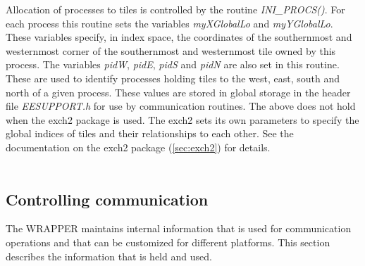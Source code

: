 Allocation of processes to tiles is controlled by the routine {\em
  INI\_PROCS()}. For each process this routine sets the variables {\em
  myXGlobalLo} and {\em myYGlobalLo}.  These variables specify, in
index space, the coordinates of the southernmost and westernmost
corner of the southernmost and westernmost tile owned by this process.
The variables {\em pidW}, {\em pidE}, {\em pidS} and {\em pidN} are
also set in this routine. These are used to identify processes holding
tiles to the west, east, south and north of a given process. These
values are stored in global storage in the header file {\em
  EESUPPORT.h} for use by communication routines.  The above does not
hold when the exch2 package is used.  The exch2 sets its own
parameters to specify the global indices of tiles and their
relationships to each other.  See the documentation on the exch2
package (\ref{sec:exch2}) for details.
\\

 \\


\subsection{Controlling communication}
The WRAPPER maintains internal information that is used for communication
operations and that can be customized for different platforms. This section 
describes the information that is held and used.

